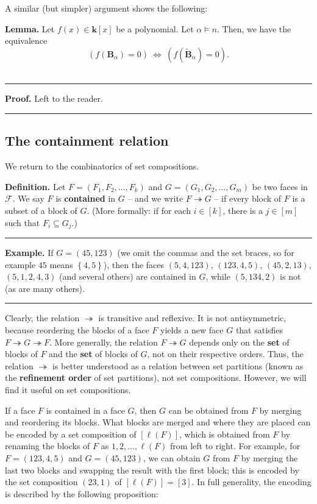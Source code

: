 \documentclass[12pt]{article}
\theoremstyle{definition}%
\newtheorem{lem}[thm]{Lemma}
\theoremstyle{definition}%
\newtheorem{defn}[thm]{Definition}
\newtheorem{exmp}[thm]{Example}
\theoremstyle{remark}%
\newcommand{\tup}[1]{\left( #1 \right)}
\newcommand{\sbr}[1]{\left[ #1 \right]} %
\newcommand{\interval}[1]{\left[ #1 \right]} %
\newcommand{\set}[1]{\left\{ #1 \right\}}
\newcommand{\kk}{\mathbf{k}}
\newcommand{\BBa}{\mathbf{B}_{\alpha}}
\newcommand{\BBta}{\widetilde{\mathbf{B}}_{\alpha}}
\newcommand{\CF}{\mathcal{F}}
\newcommand{\con}{\twoheadrightarrow} %
\newcommand{\defin}[1]{\textbf{#1}}
\newenvironment{lem}[1][Lemma]{\noindent\textbf{#1.} }{\ \rule{0.5em}{0.5em}}
\newenvironment{defn}[1][Definition]{\noindent\textbf{#1.} }{\ \rule{0.5em}{0.5em}}
\newenvironment{exmp}[1][Example]{\noindent\textbf{#1.} }{\ \rule{0.5em}{0.5em}}
\newenvironment{proof}[1][Proof]{\noindent\textbf{#1.} }{\ \rule{0.5em}{0.5em}}
\begin{document}
A similar (but simpler) argument shows the following:

\begin{lem}
\label{lem.standin2}
Let $f\tup{x} \in \kk\sbr{x}$ be a polynomial.
Let $\alpha \models n$.
Then, we have the equivalence
\[
\tup{f\tup{\BBa} = 0}
\ \Longleftrightarrow\ %
\tup{f\tup{\BBta} = 0}.
\]
\end{lem}

\begin{proof}
Left to the reader.
\end{proof}

\subsection{The containment relation}

We return to the combinatorics of set compositions.

\begin{defn}
    Let $F = \tup{F_1, F_2, \dots, F_k}$ and $G = \tup{G_1, G_2, \dots, G_m}$ be two faces in $\CF$.
    We say $F$ is \defin{contained} in $G$ -- and we write $F \con G$ -- if every block of $F$ is a subset of a block of $G$. (More formally: if for each $i \in \interval{k}$, there is a $j \in \interval{m}$ such that $F_i \subseteq G_j$.)
\end{defn}

\begin{exmp}
   If $G = \tup{45,123}$ (we omit the commas and the set braces, so for example $45$ means $\set{4,5}$), then the faces $\tup{5,4,123}$, $\tup{123,4,5}$, $\tup{45,2,13}$, $\tup{5,1,2,4,3}$ (and several others) are contained in $G$, while $\tup{5,134,2}$ is not (as are many others).
\end{exmp}

Clearly, the relation $\con$ is transitive and reflexive.
It is not antisymmetric, because reordering the blocks of a face $F$ yields a new face $G$ that satisfies $F \con G \con F$.
More generally, the relation $F \con G$ depends only on the \textbf{set} of blocks of $F$ and the \textbf{set} of blocks of $G$, not on their respective orders.
Thus, the relation $\con$ is better understood as a relation between set partitions (known as the \defin{refinement order} of set partitions), not set compositions.
However, we will find it useful on set compositions.

If a face $F$ is contained in a face $G$, then $G$ can be obtained from $F$ by merging and reordering its blocks. What blocks are merged and where they are placed can be encoded by a set composition of $\interval{\ell \tup{F}}$, which is obtained from $F$ by renaming the blocks of $F$ as $1,2,\ldots,\ell\tup{F}$ from left to right.
For example, for $F = \tup{123,4,5}$ and $G = \tup{45,123}$, we can obtain $G$ from $F$ by merging the last two blocks and swapping the result with the first block; this is encoded by the set composition $\tup{23, 1}$ of $\interval{\ell\tup{F}} = \interval{3}$.
In full generality, the encoding is described by the following proposition:
\end{document}
